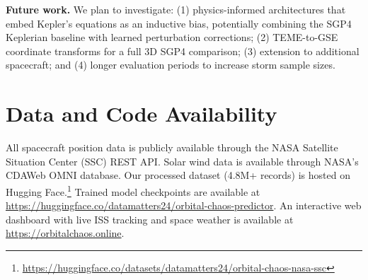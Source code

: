 \documentclass[twocolumn]{article}
\begin{document}
\textbf{Future work.} We plan to investigate: (1) physics-informed
architectures that embed Kepler's equations as an inductive bias,
potentially combining the SGP4 Keplerian baseline with learned
perturbation corrections; (2) TEME-to-GSE coordinate transforms
for a full 3D SGP4 comparison; (3) extension to additional spacecraft;
and (4) longer evaluation periods to increase storm sample sizes.

\section*{Data and Code Availability}

All spacecraft position data is publicly available through the NASA
Satellite Situation Center (SSC) REST API. Solar wind data is available
through NASA's CDAWeb OMNI database. Our processed dataset (4.8M+
records) is hosted on Hugging
Face.\footnote{\url{https://huggingface.co/datasets/datamatters24/orbital-chaos-nasa-ssc}}
Trained model checkpoints are available at
\url{https://huggingface.co/datamatters24/orbital-chaos-predictor}.
An interactive web dashboard with live ISS tracking and space weather
is available at \url{https://orbitalchaos.online}.



\end{document}
